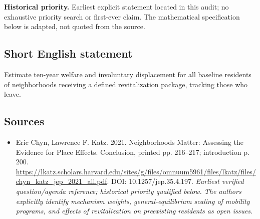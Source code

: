 \documentclass[11pt]{article}
\begin{document}
\par\textbf{Historical priority.} Earliest explicit statement located in this audit; no exhaustive priority search or first-ever claim. The mathematical specification below is adapted, not quoted from the source.

\subsection{Short English statement}
Estimate ten-year welfare and involuntary displacement for all baseline residents of neighborhoods receiving a defined revitalization package, tracking those who leave.

\subsection{Sources}
\begin{itemize}\raggedright
\item[\textnormal{[S1]}]\hypertarget{source:30007747:1}{} Eric Chyn, Lawrence F. Katz. 2021. Neighborhoods Matter: Assessing the Evidence for Place Effects. Conclusion, printed pp. 216–217; introduction p. 200.
\url{https://lkatz.scholars.harvard.edu/sites/g/files/omnuum5961/files/lkatz/files/chyn_katz_jep_2021_all.pdf}.
DOI: 10.1257/jep.35.4.197.
{\small\textit{Earliest verified question/agenda reference; historical priority qualified below. The authors explicitly identify mechanism weights, general-equilibrium scaling of mobility programs, and effects of revitalization on preexisting residents as open issues.}}
\end{itemize}
\end{document}
